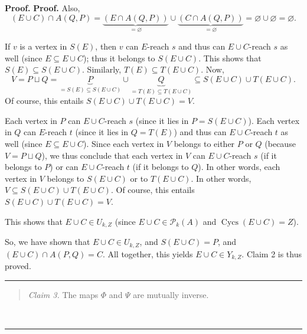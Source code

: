 \documentclass[numbers=enddot,12pt,final,onecolumn,notitlepage]{scrartcl}%
\theoremstyle{definition}
\newenvironment{statement}{\begin{quote}}{\end{quote}}
\newenvironment{proof}[1][Proof]{\noindent\textbf{#1.} }{\ \rule{0.5em}{0.5em}}
\newenvironment{noncompile}{}{}
\theoremstyle{plainsl}
\begin{document}
\begin{proof}
\begin{proof}
\begin{noncompile}
Also,%
\[
\left(  E\cup C\right)  \cap A\left(  Q,P\right)  =\underbrace{\left(  E\cap
A\left(  Q,P\right)  \right)  }_{=\varnothing}\cup\underbrace{\left(  C\cap
A\left(  Q,P\right)  \right)  }_{=\varnothing}=\varnothing\cup\varnothing
=\varnothing.
\]

\end{noncompile}

If $v$ is a vertex in $S\left(  E\right)  $, then $v$ can $E$-reach $s$ and
thus can $E\cup C$-reach $s$ as well (since $E\subseteq E\cup C$); thus it
belongs to $S\left(  E\cup C\right)  $. This shows that $S\left(  E\right)
\subseteq S\left(  E\cup C\right)  $. Similarly, $T\left(  E\right)  \subseteq
T\left(  E\cup C\right)  $. Now,
\[
V=P\sqcup Q=\underbrace{P}_{=S\left(  E\right)  \subseteq S\left(  E\cup
C\right)  }\cup\underbrace{Q}_{=T\left(  E\right)  \subseteq T\left(  E\cup
C\right)  }\subseteq S\left(  E\cup C\right)  \cup T\left(  E\cup C\right)  .
\]
Of course, this entails $S\left(  E\cup C\right)  \cup T\left(  E\cup
C\right)  =V$.

\begin{noncompile}
Each vertex in $P$ can $E\cup C$-reach $s$ (since it lies in $P=S\left(  E\cup
C\right)  $). Each vertex in $Q$ can $E$-reach $t$ (since it lies in
$Q=T\left(  E\right)  $) and thus can $E\cup C$-reach $t$ as well (since
$E\subseteq E\cup C$). Since each vertex in $V$ belongs to either $P$ or $Q$
(because $V=P\sqcup Q$), we thus conclude that each vertex in $V$ can $E\cup
C$-reach $s$ (if it belongs to $P$) or can $E\cup C$-reach $t$ (if it belongs
to $Q$). In other words, each vertex in $V$ belongs to $S\left(  E\cup
C\right)  $ or to $T\left(  E\cup C\right)  $. In other words, $V\subseteq
S\left(  E\cup C\right)  \cup T\left(  E\cup C\right)  $. Of course, this
entails $S\left(  E\cup C\right)  \cup T\left(  E\cup C\right)  =V$.
\end{noncompile}

This shows that $E\cup C\in U_{k,Z}$ (since $E\cup C\in\mathcal{P}_{k}\left(
A\right)  $ and $\operatorname*{Cycs}\left(  E\cup C\right)  =Z$).

So, we have shown that $E\cup C\in U_{k,Z}$, and $S\left(  E\cup C\right)
=P$, and $\left(  E\cup C\right)  \cap A\left(  P,Q\right)  =C$. All together,
this yields $E\cup C\in Y_{k,Z}$. Claim 2 is thus proved.
\end{proof}

\begin{statement}
\textit{Claim 3.} The maps $\Phi$ and $\Psi$ are mutually inverse.
\end{statement}


\end{proof}
\end{document}
